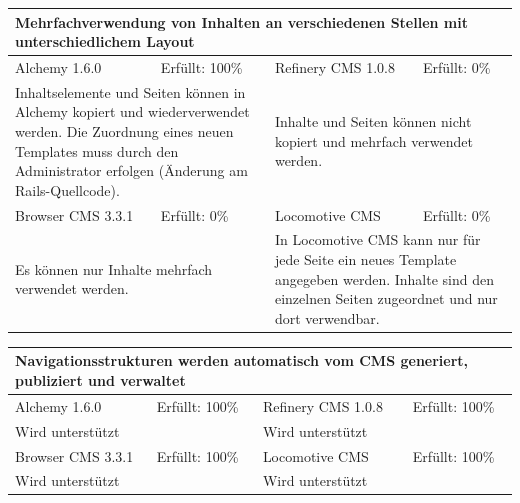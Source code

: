 \newline
\newline
\newline
\begin{tabular}[!ht]{|l|l|l|l|}
\hline
\multicolumn{4}{|p{15cm}|}{\textbf{Mehrfachverwendung von Inhalten an verschiedenen Stellen mit unterschiedlichem Layout}} \\
\hline
  Alchemy 1.6.0 & \cellcolor{green}Erfüllt: 100\% & Refinery CMS 1.0.8 & \cellcolor{red}Erfüllt: 0\% \\
  \hline
  \multicolumn{2}{|p{7.5cm}|}{Inhaltselemente und Seiten können in Alchemy kopiert und wiederverwendet werden. Die Zuordnung eines neuen Templates muss durch den Administrator erfolgen (Änderung am Rails-Quellcode).} & \multicolumn{2}{p{7.5cm}|}{Inhalte und Seiten können nicht kopiert und mehrfach verwendet werden.} \\
  \hline
  Browser CMS 3.3.1 & \cellcolor{red}Erfüllt: 0\% & Locomotive CMS & \cellcolor{red}Erfüllt: 0\% \\
  \hline
  \multicolumn{2}{|p{7.5cm}|}{Es können nur Inhalte mehrfach verwendet werden.} & \multicolumn{2}{p{7.5cm}|}{In Locomotive CMS kann nur für jede Seite ein neues Template angegeben werden. Inhalte sind den einzelnen Seiten zugeordnet und nur dort verwendbar.} \\
\hline
\end{tabular}
\newline
\newline
\newline
\begin{tabular}[!ht]{|l|l|l|l|}
\hline
\multicolumn{4}{|p{15cm}|}{\textbf{Navigationsstrukturen werden automatisch vom CMS generiert, publiziert und verwaltet}} \\
\hline
  Alchemy 1.6.0 & \cellcolor{green}Erfüllt: 100\% & Refinery CMS 1.0.8 & \cellcolor{green}Erfüllt: 100\% \\
  \hline
  \multicolumn{2}{|p{7.5cm}|}{Wird unterstützt} & \multicolumn{2}{p{7.5cm}|}{Wird unterstützt} \\
  \hline
  Browser CMS 3.3.1 & \cellcolor{green}Erfüllt: 100\% & Locomotive CMS & \cellcolor{green}Erfüllt: 100\% \\
  \hline
  \multicolumn{2}{|p{7.5cm}|}{Wird unterstützt} & \multicolumn{2}{p{7.5cm}|}{Wird unterstützt} \\
\hline
\end{tabular}
\newline
\newline
\newline
